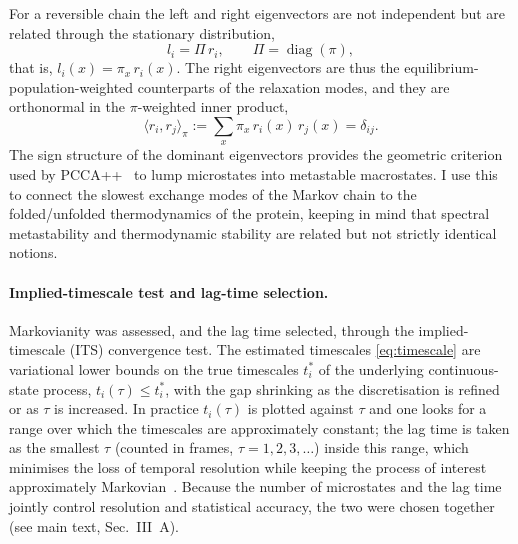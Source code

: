 For a reversible chain the left and right eigenvectors are not
independent but are related through the stationary distribution,
\begin{equation}
  l_i = \Pi\, r_i, \qquad \Pi = \operatorname{diag}(\pi),
  \label{eq:detbal}
\end{equation}
that is, $l_i(x) = \pi_x\, r_i(x)$. The right eigenvectors are thus the
equilibrium-population-weighted counterparts of the relaxation modes,
and they are orthonormal in the $\pi$-weighted inner product,
\begin{equation}
  \langle r_i, r_j \rangle_\pi
    := \sum_x \pi_x\, r_i(x)\, r_j(x) = \delta_{ij}.
  \label{eq:piorth}
\end{equation}
The sign structure of the dominant eigenvectors provides the geometric
criterion used by PCCA++~\cite[Ch.~2.5.1--2.5.2]{thebible} to lump
microstates into metastable macrostates. I use this to connect the
slowest exchange modes of the Markov chain to the folded/unfolded
thermodynamics of the protein, keeping in mind that spectral
metastability and thermodynamic stability are related but not strictly
identical notions.

\paragraph{Implied-timescale test and lag-time selection.}
Markovianity was assessed, and the lag time selected, through the
implied-timescale (ITS) convergence test. The estimated timescales
\eqref{eq:timescale} are variational lower bounds on the true timescales
$t_i^\ast$ of the underlying continuous-state process,
$t_i(\tau) \leq t_i^\ast$, with the gap shrinking as the discretisation
is refined or as $\tau$ is increased. In practice $t_i(\tau)$ is plotted
against $\tau$ and one looks for a range over which the timescales are
approximately constant; the lag time is taken as the smallest $\tau$
(counted in frames, $\tau = 1, 2, 3, \dots$) inside this range, which
minimises the loss of temporal resolution while keeping the process of
interest approximately Markovian~\cite[Ch.~4.7]{thebible}. Because the
number of microstates and the lag time jointly control resolution and
statistical accuracy, the two were chosen together (see main text,
Sec.~III~A).
